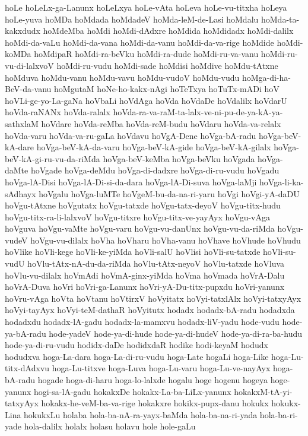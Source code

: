 {hoLe
hoLeLx-ga-Lanunx
hoLeLxya
hoLe-vAta
hoLeva
hoLe-vu-titxha
hoLeya
hoLe-yuva
hoMDa
hoMdada
hoMdadeV
hoMda-leM-de-Lasi
hoMdalu
hoMda-ta-kakxdudx
hoMdeMba
hoMdi
hoMdi-dAdxre
hoMdida
hoMdidadx
hoMdi-dalilx
hoMdi-da-vaLu
hoMdi-da-vana
hoMdi-da-vanu
hoMdi-da-va-rige
hoMdide
hoMdi-koMDa
hoMdipaR
hoMdi-ra-beVku
hoMdi-ra-dude
hoMdi-ru-va-vanu
hoMdi-ru-vu-di-lalxvoV
hoMdi-ru-vudu
hoMdi-sade
hoMdisi
hoMdive
hoMdu-tAtxne
hoMduva
hoMdu-vanu
hoMdu-vavu
hoMdu-vudoV
hoMdu-vudu
hoMga-di-ha-BeV-da-vanu
hoMgutaM
hoNe-ho-kakx-nAgi
hoTeTxya
hoTuTx-mADi
hoV
hoVLi-ge-yo-La-gaNa
hoVbaLi
hoVdAga
hoVda
hoVdaDe
hoVdalilx
hoVdarU
hoVda-raNANx
hoVda-ralalx
hoVda-ra-va-raM-ta-lalx-ve-ni-pu-de-ya-kA-ya-sathxlaM
hoVdare
hoVda-reMba
hoVda-reM-budu
hoVdaru
hoVda-va-relalx
hoVda-varu
hoVda-va-ru-gaLa
hoVdavu
hoVgA-Dene
hoVga-bA-radu
hoVga-beV-kA-dare
hoVga-beV-kA-da-varu
hoVga-beV-kA-gide
hoVga-beV-kA-gilalx
hoVga-beV-kA-gi-ru-vu-da-riMda
hoVga-beV-keMba
hoVga-beVku
hoVgada
hoVga-daMte
hoVgade
hoVga-deMdu
hoVga-di-dadxre
hoVga-di-ru-vudu
hoVgadu
hoVga-lA-Disi
hoVga-lA-Di-si-da-dara
hoVga-lA-Di-suva
hoVga-laMji
hoVga-li-ka-sAdhayx
hoVgalu
hoVga-luMTe
hoVgeM-bu-da-na-ri-yaru
hoVgi
hoVgi-yA-daDU
hoVgu-tAtxne
hoVgutatx
hoVgu-tatxde
hoVgu-tatx-deyoV
hoVgu-titx-hudu
hoVgu-titx-ra-li-lalxvoV
hoVgu-titxre
hoVgu-titx-ve-yayAyx
hoVgu-vAga
hoVguva
hoVgu-vaMte
hoVgu-varu
hoVgu-vu-danUnx
hoVgu-vu-da-riMda
hoVgu-vudeV
hoVgu-vu-dilalx
hoVha
hoVharu
hoVha-vanu
hoVhave
hoVhude
hoVhudu
hoVlike
hoVli-kege
hoVli-ke-yiMda
hoVli-salU
hoVlisi
hoVli-su-tatxde
hoVli-su-vudU
hoVlu-tAtx-nA-du-da-riMda
hoVlu-tAtx-neyoV
hoVlu-tatxde
hoVluva
hoVlu-vu-dilalx
hoVmAdi
hoVmA-ginx-yiMda
hoVma
hoVmada
hoVrA-Dalu
hoVrA-Duva
hoVri
hoVri-ga-Lanunx
hoVri-yA-Du-titx-pupxdu
hoVri-yanunx
hoVru-vAga
hoVta
hoVtanu
hoVtirxV
hoVyitatx
hoVyi-tatxlAlx
hoVyi-tatxyAyx
hoVyi-tayAyx
hoVyi-teM-dathaR
hoVyitutx
hodadx
hodadx-bA-radu
hodadxda
hodadxdu
hodadx-lA-gadu
hodadx-la-mamxvu
hodadx-liV-yadu
hode-vudu
hode-ya-bA-radu
hode-yadeV
hode-ya-di-hude
hode-ya-di-hudeV
hode-ya-di-ra-ba-hudu
hode-ya-di-ru-vudu
hodidx-daDe
hodidxdaR
hodike
hodi-keyaM
hodudx
hodudxva
hoga-La-dara
hoga-La-di-ru-vudu
hoga-Late
hogaLi
hoga-Like
hoga-Lu-titx-dAdxvu
hoga-Lu-titxve
hoga-Luva
hoga-Lu-varu
hoga-Lu-ve-nayAyx
hoga-bA-radu
hogade
hoga-di-haru
hoga-lo-lalxde
hogalu
hoge
hogenu
hogeya
hoge-yanunx
hogi-sa-lA-gadu
hokakxDe
hokakx-La-ba-LiLx-yanunx
hokakxM-tA-yi-tatxyAyx
hokakx-he-veM-ba-va-rige
hokakxre
hokikx-pupx-danu
hokukx
hokukx-Lina
hokukxLu
holaba
hola-ba-nA-ra-yayx-baMda
hola-ba-na-ri-yada
hola-ba-ri-yade
hola-dalilx
holalx
holasu
holavu
hole
hole-gaLu
}

